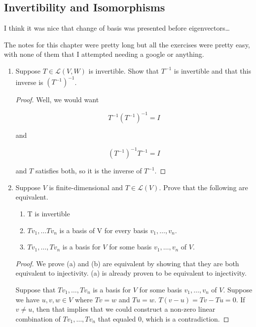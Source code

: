 \subsection{Invertibility and Isomorphisms}

I think it was nice that change of basis was presented before eigenvectors\dots

The notes for this chapter were pretty long but all the exercises were pretty easy, with none of them that I attempted needing a google or anything.

\begin{enumerate}
    \item[1] Suppose $T \in \mathcal L(V, W)$ is invertible. Show that $T^{-1}$ is invertible and that this inverse is $(T^{-1})^{-1}$.
    
    \begin{proof}
        Well, we would want 

        \[T^{-1}(T^{-1})^{-1} = I\]

        and

        \[(T^{-1})^{-1}T^{-1}=I\]

        and $T$ satisfies both, so it is the inverse of $T^{-1}$.
    \end{proof}

    \item[3] Suppose $V$ is finite-dimensional and $T \in \mathcal L(V)$. Prove that the following are equivalent.
    
    \begin{enumerate}
        \item T is invertible
        \item $Tv_1, \dots Tv_n$ is a basis of V for every basis $v_1, \dots, v_n$.
        \item $Tv_1, \dots, Tv_n$ is a basis for $V$ for some basis $v_1, \dots, v_n$ of $V$.
    \end{enumerate}

    \begin{proof}
        We prove (a) and (b) are equivalent by showing that they are both equivalent to injectivity. (a) is already proven to be equivalent to injectivity. 

        Suppose that $Tv_1, \dots, Tv_n$ is a basis for $V$ for some basis $v_1, \dots, v_n$ of $V$. Suppose we have $u, v, w \in V$ where $Tv = w$ and $Tu = w$. $T(v - u) = Tv - Tu = 0$. If $v \neq u$, then that implies that we could construct a non-zero linear combination of $Tv_1, \dots, Tv_n$ that equaled 0, which is a contradiction. 


\end{proof}
\end{enumerate}
